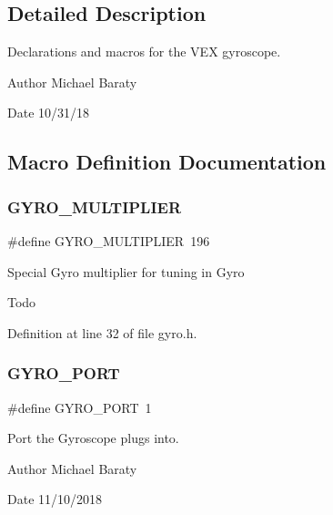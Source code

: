 \subsection{Detailed Description}
Declarations and macros for the V\+EX gyroscope. 

\begin{DoxyAuthor}{Author}
Michael Baraty 
\end{DoxyAuthor}
\begin{DoxyDate}{Date}
10/31/18 
\end{DoxyDate}


\subsection{Macro Definition Documentation}
\mbox{\label{gyro_8h_a482017cc25be9213fef3222112eb1c7f}} 
\subsubsection{G\+Y\+R\+O\+\_\+\+M\+U\+L\+T\+I\+P\+L\+I\+ER}
{\footnotesize\ttfamily \#define G\+Y\+R\+O\+\_\+\+M\+U\+L\+T\+I\+P\+L\+I\+ER~196}

Special Gyro multiplier for tuning in Gyro \begin{DoxyRefDesc}{Todo}
\item[\textbf{ Todo}]\end{DoxyRefDesc}


Definition at line 32 of file gyro.\+h.

\mbox{\label{gyro_8h_a51d281e7676749d34aab3f8ba6fab960}} 
\subsubsection{G\+Y\+R\+O\+\_\+\+P\+O\+RT}
{\footnotesize\ttfamily \#define G\+Y\+R\+O\+\_\+\+P\+O\+RT~1}



Port the Gyroscope plugs into. 

\begin{DoxyAuthor}{Author}
Michael Baraty 
\end{DoxyAuthor}
\begin{DoxyDate}{Date}
11/10/2018 
\end{DoxyDate}


